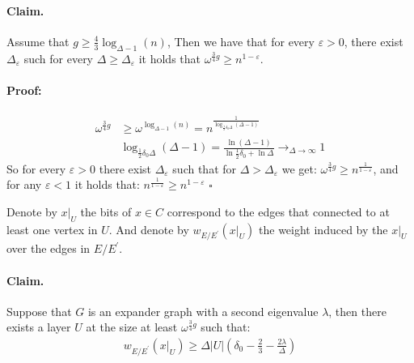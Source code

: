 \documentclass{article}
\begin{document}
\begin{multicols*}{2}
\paragraph{Claim.} Assume that $ g \ge \frac{4}{3} \log_{\Delta -1 }\left( n \right) $, Then we have that for every $\varepsilon >0 $,  there exist $\Delta_{\varepsilon}$  such for every $\Delta \ge \Delta_{\varepsilon}$  it holds that $ \omega^{\frac{3}{4}g} \ge n^{1-\varepsilon}$.
\paragraph{Proof:}

\begin{equation*}
  \begin{split}
    \omega^{\frac{3}{4}g}&\ge \omega^{\log_{\Delta-1}\left( n \right)} = n^{\frac{1}{\log_{\frac{1}{2}\delta_{0}\Delta}\left( \Delta -1 \right)}} \\ 
    & \log_{\frac{1}{2}\delta_{0}\Delta}\left( \Delta -1 \right) = \frac{\ln\left( \Delta-1 \right)}{\ln\frac{1}{2}\delta_{0}+ \ln \Delta} \rightarrow_{\Delta\rightarrow \infty} 1
  \end{split}
\end{equation*} So for every $\varepsilon >0 $ there exist $\Delta_{\varepsilon}$ such that for $\Delta > \Delta_{\varepsilon}$ we get: $\omega^{\frac{3}{4}g} \ge n^{\frac{1}{1-\varepsilon}}$, and for any $\varepsilon < 1$ it holds that: $ n^{\frac{1}{1-\varepsilon}}\ge n^{1-\varepsilon}$ $\square$

Denote by $x|_{U}$ the bits of $x\in C$ correspond to the edges that connected to at least one vertex in $U$. And denote by $w_{E/E^{\prime}}\left( x|_{U} \right)$ the weight induced by the $x|_{U}$ over the edges in $E/E^\prime$.
\paragraph{Claim.} Suppose that $G$ is an expander graph with a second eigenvalue $\lambda$, then there exists a layer $U$ at the size at least $\omega^{ \frac{3}{4}g }$ such that:
\begin{equation*}
  \begin{split}
    w_{E/E^{\prime}}\left( x|_{U} \right)\ge\Delta|U|\left( \delta_{0}-\frac{2}{3}-\frac{2\lambda}{\Delta} \right)
  \end{split}
\end{equation*}

\end{multicols*}
\end{document}
